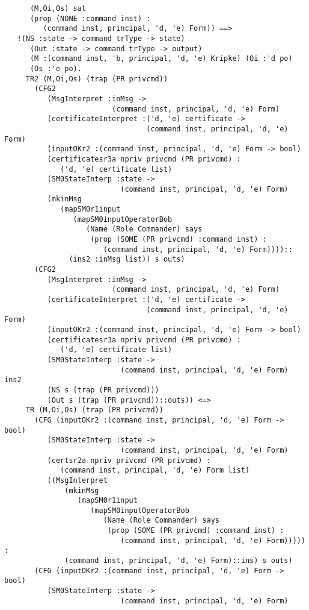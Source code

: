 \documentclass{report}
\begin{document}
\begin{session}
\begin{scriptsize}
\begin{verbatim}
      (M,Oi,Os) sat
      (prop (NONE :command inst) :
         (command inst, principal, 'd, 'e) Form)) ==>
   !(NS :state -> command trType -> state)
      (Out :state -> command trType -> output)
      (M :(command inst, 'b, principal, 'd, 'e) Kripke) (Oi :'d po)
      (Os :'e po).
     TR2 (M,Oi,Os) (trap (PR privcmd))
       (CFG2
          (MsgInterpret :inMsg ->
                         (command inst, principal, 'd, 'e) Form)
          (certificateInterpret :('d, 'e) certificate ->
                                 (command inst, principal, 'd, 'e) Form)
          (inputOKr2 :(command inst, principal, 'd, 'e) Form -> bool)
          (certificatesr3a npriv privcmd (PR privcmd) :
             ('d, 'e) certificate list)
          (SM0StateInterp :state ->
                           (command inst, principal, 'd, 'e) Form)
          (mkinMsg
             (mapSM0r1input
                (mapSM0inputOperatorBob
                   (Name (Role Commander) says
                    (prop (SOME (PR privcmd) :command inst) :
                       (command inst, principal, 'd, 'e) Form))))::
               (ins2 :inMsg list)) s outs)
       (CFG2
          (MsgInterpret :inMsg ->
                         (command inst, principal, 'd, 'e) Form)
          (certificateInterpret :('d, 'e) certificate ->
                                 (command inst, principal, 'd, 'e) Form)
          (inputOKr2 :(command inst, principal, 'd, 'e) Form -> bool)
          (certificatesr3a npriv privcmd (PR privcmd) :
             ('d, 'e) certificate list)
          (SM0StateInterp :state ->
                           (command inst, principal, 'd, 'e) Form) ins2
          (NS s (trap (PR privcmd)))
          (Out s (trap (PR privcmd))::outs)) <=>
     TR (M,Oi,Os) (trap (PR privcmd))
       (CFG (inputOKr2 :(command inst, principal, 'd, 'e) Form -> bool)
          (SM0StateInterp :state ->
                           (command inst, principal, 'd, 'e) Form)
          (certsr2a npriv privcmd (PR privcmd) :
             (command inst, principal, 'd, 'e) Form list)
          ((MsgInterpret
              (mkinMsg
                 (mapSM0r1input
                    (mapSM0inputOperatorBob
                       (Name (Role Commander) says
                        (prop (SOME (PR privcmd) :command inst) :
                           (command inst, principal, 'd, 'e) Form))))) :
              (command inst, principal, 'd, 'e) Form)::ins) s outs)
       (CFG (inputOKr2 :(command inst, principal, 'd, 'e) Form -> bool)
          (SM0StateInterp :state ->
                           (command inst, principal, 'd, 'e) Form)

\end{verbatim}
\end{scriptsize}
\end{session}
\end{document}
